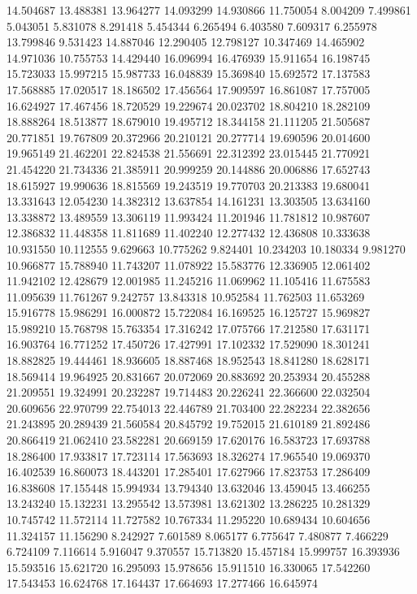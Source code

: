 14.504687
13.488381
13.964277
14.093299
14.930866
11.750054
8.004209
7.499861
5.043051
5.831078
8.291418
5.454344
6.265494
6.403580
7.609317
6.255978
13.799846
9.531423
14.887046
12.290405
12.798127
10.347469
14.465902
14.971036
10.755753
14.429440
16.096994
16.476939
15.911654
16.198745
15.723033
15.997215
15.987733
16.048839
15.369840
15.692572
17.137583
17.568885
17.020517
18.186502
17.456564
17.909597
16.861087
17.757005
16.624927
17.467456
18.720529
19.229674
20.023702
18.804210
18.282109
18.888264
18.513877
18.679010
19.495712
18.344158
21.111205
21.505687
20.771851
19.767809
20.372966
20.210121
20.277714
19.690596
20.014600
19.965149
21.462201
22.824538
21.556691
22.312392
23.015445
21.770921
21.454220
21.734336
21.385911
20.999259
20.144886
20.006886
17.652743
18.615927
19.990636
18.815569
19.243519
19.770703
20.213383
19.680041
13.331643
12.054230
14.382312
13.637854
14.161231
13.303505
13.634160
13.338872
13.489559
13.306119
11.993424
11.201946
11.781812
10.987607
12.386832
11.448358
11.811689
11.402240
12.277432
12.436808
10.333638
10.931550
10.112555
9.629663
10.775262
9.824401
10.234203
10.180334
9.981270
10.966877
15.788940
11.743207
11.078922
15.583776
12.336905
12.061402
11.942102
12.428679
12.001985
11.245216
11.069962
11.105416
11.675583
11.095639
11.761267
9.242757
13.843318
10.952584
11.762503
11.653269
15.916778
15.986291
16.000872
15.722084
16.169525
16.125727
15.969827
15.989210
15.768798
15.763354
17.316242
17.075766
17.212580
17.631171
16.903764
16.771252
17.450726
17.427991
17.102332
17.529090
18.301241
18.882825
19.444461
18.936605
18.887468
18.952543
18.841280
18.628171
18.569414
19.964925
20.831667
20.072069
20.883692
20.253934
20.455288
21.209551
19.324991
20.232287
19.714483
20.226241
22.366600
22.032504
20.609656
22.970799
22.754013
22.446789
21.703400
22.282234
22.382656
21.243895
20.289439
21.560584
20.845792
19.752015
21.610189
21.892486
20.866419
21.062410
23.582281
20.669159
17.620176
16.583723
17.693788
18.286400
17.933817
17.723114
17.563693
18.326274
17.965540
19.069370
16.402539
16.860073
18.443201
17.285401
17.627966
17.823753
17.286409
16.838608
17.155448
15.994934
13.794340
13.632046
13.459045
13.466255
13.243240
15.132231
13.295542
13.573981
13.621302
13.286225
10.281329
10.745742
11.572114
11.727582
10.767334
11.295220
10.689434
10.604656
11.324157
11.156290
8.242927
7.601589
8.065177
6.775647
7.480877
7.466229
6.724109
7.116614
5.916047
9.370557
15.713820
15.457184
15.999757
16.393936
15.593516
15.621720
16.295093
15.978656
15.911510
16.330065
17.542260
17.543453
16.624768
17.164437
17.664693
17.277466
16.645974
